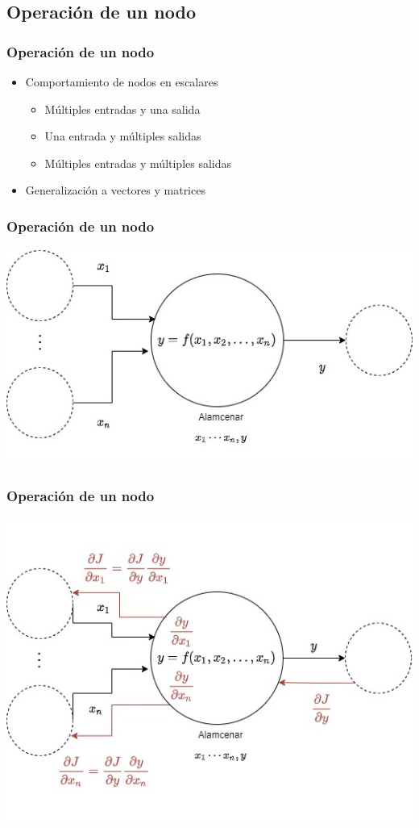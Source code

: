\documentclass{beamer}
\begin{document}

\subsection{Operación de un nodo}
\begin{frame}
\frametitle{Operación de un nodo}
\begin{itemize}
\item Comportamiento de nodos en escalares
\begin{itemize}
\item Múltiples entradas y una salida
\item Una entrada y múltiples salidas
\item Múltiples entradas y múltiples salidas 
\end{itemize}
\item Generalización a vectores y matrices
\end{itemize}
\end{frame}
\begin{frame}
\frametitle{Operación de un nodo}
\includegraphics[scale=0.4]{im10}
\end{frame}
\begin{frame}
\frametitle{Operación de un nodo}
\includegraphics[scale=0.4]{im11}
\end{frame}
\end{document}
